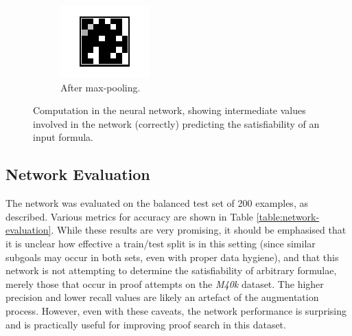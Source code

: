 \documentclass{llncs}
\newcommand{\mizarlarge}{\textit{M40k}}
\begin{document}
\begin{figure}
	\begin{subfigure}{.3\textwidth}
		\centering
		\includegraphics[width=\linewidth]{fc0}
		\caption{After max-pooling.}
	\end{subfigure}
	\caption{Computation in the neural network, showing intermediate values involved in the network (correctly) predicting the satisfiability of an input formula.}
	\label{figure:computation}
\end{figure}

\subsection{Network Evaluation}
The network was evaluated on the balanced test set of 200 examples, as described.
Various metrics for accuracy are shown in Table \ref{table:network-evaluation}.
While these results are very promising, it should be emphasised that it is unclear how effective a train/test split is in this setting (since similar subgoals may occur in both sets, even with proper data hygiene), and that this network is not attempting to determine the satisfiability of arbitrary formulae, merely those that occur in proof attempts on the \mizarlarge{} dataset.
The higher precision and lower recall values are likely an artefact of the augmentation process.
However, even with these caveats, the network performance is surprising and is practically useful for improving proof search in this dataset.
\end{document}
